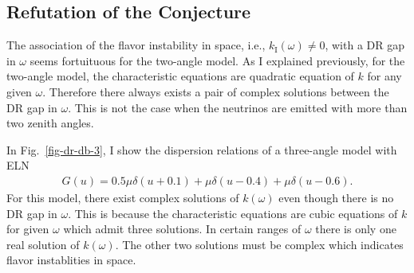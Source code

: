 \subsection{\label{chap:collective-sec:fast-mode-subsec:instability-to-gap}Refutation of the Conjecture}

The association of the flavor instability in space, i.e., $k_{\mathrm I}(\omega)\neq 0$, with a DR gap in $\omega$ seems fortuituous for the two-angle model. As I explained previously, for the two-angle model, the characteristic equations are quadratic equation of $k$ for any given $\omega$. Therefore there always exists a pair of complex solutions between the DR gap in $\omega$. This is not the case when the neutrinos are emitted with more than two zenith angles.

In Fig.~\ref{fig-dr-db-3}, I show the dispersion relations of a three-angle model with ELN
\begin{align}
    G(u) = 0.5\mu \delta(u+0.1) + \mu \delta(u - 0.4) + \mu \delta(u-0.6).
\end{align}
For this model, there exist complex solutions of $k(\omega)$ even though there is no DR gap in $\omega$. This is because the characteristic equations are cubic equations of $k$ for given $\omega$ which admit three solutions. In certain ranges of $\omega$ there is only one real solution of $k(\omega)$. The other two solutions must be complex which indicates flavor instablities in space.



